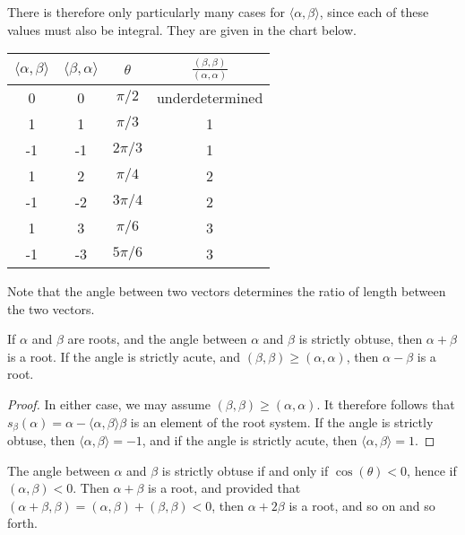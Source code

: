 There is therefore only particularly many cases for $\langle \alpha, \beta \rangle$, since each of these values must also be integral. They are given in the chart below.

\begin{center}
\begin{tabular}{|c | c | c | c |}
    \hline
    $\langle \alpha, \beta \rangle$ & $\langle \beta, \alpha \rangle$ & $\theta$ & $\frac{(\beta, \beta)}{(\alpha, \alpha)}$\\
    \hline
    0 & 0 & $\pi/2$ & underdetermined\\
    1 & 1 & $\pi/3$ & 1\\
    -1 & -1 & $2\pi/3$ & 1\\
    1 & 2 & $\pi/4$ & 2\\
    -1 & -2 & $3\pi/4$ & 2\\
    1 & 3 & $\pi/6$ & 3\\
    -1 & -3 & $5\pi/6$ & 3\\
    \hline
\end{tabular}
\end{center}

Note that the angle between two vectors determines the ratio of length between the two vectors.

\begin{theorem}
    If $\alpha$ and $\beta$ are roots, and the angle between $\alpha$ and $\beta$ is strictly obtuse, then $\alpha + \beta$ is a root. If the angle is strictly acute, and $(\beta, \beta) \geq (\alpha, \alpha)$, then $\alpha - \beta$ is a root.
\end{theorem}
\begin{proof}
    In either case, we may assume $(\beta, \beta) \geq (\alpha, \alpha)$. It therefore follows that $s_\beta(\alpha) = \alpha - \langle \alpha, \beta \rangle \beta$ is an element of the root system. If the angle is strictly obtuse, then $\langle \alpha, \beta \rangle = -1$, and if the angle is strictly acute, then $\langle \alpha, \beta \rangle = 1$.
\end{proof}

The angle between $\alpha$ and $\beta$ is strictly obtuse if and only if $\cos(\theta) < 0$, hence if $(\alpha, \beta) < 0$. Then $\alpha + \beta$ is a root, and provided that $(\alpha + \beta, \beta) = (\alpha , \beta) + (\beta, \beta) < 0$, then $\alpha + 2 \beta$ is a root, and so on and so forth.

